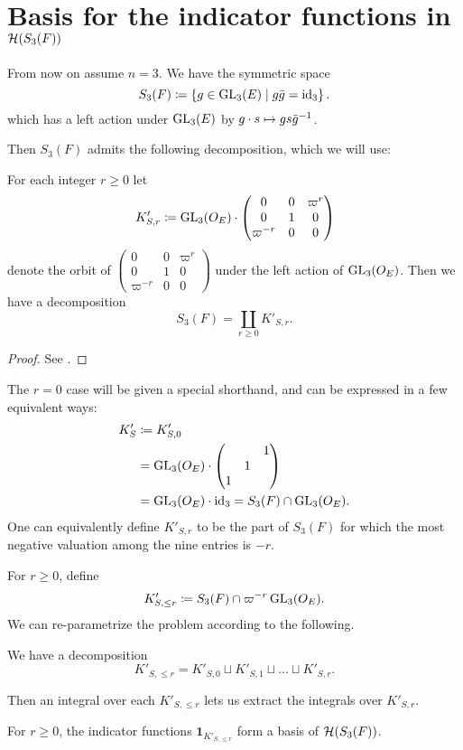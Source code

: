 \section{Basis for the indicator functions in $\mathcal H(S_3(F))$}
\label{ch:orbital0_hecke_basis}
From now on assume $n = 3$.
We have the symmetric space
\[ S_3(F) \coloneqq \left\{ g \in \operatorname{GL}_3(E) \mid g \bar{g} = \operatorname{id}_3 \right\}. \]
which has a left action under $\operatorname{GL}_3(E)$ by $g \cdot s \mapsto gs\bar{g}^{-1}$.

Then $S_3(F)$ admits the following decomposition, which we will use:
\begin{lemma}
  For each integer $r \ge 0$ let
  \[ K'_{S,r} \coloneqq \operatorname{GL}_3(O_E) \cdot \begin{pmatrix} 0 & 0 & \varpi^r \\ 0 & 1 & 0 \\ \varpi^{-r} & 0 & 0 \end{pmatrix} \]
  denote the orbit of
  $\begin{pmatrix} 0 & 0 & \varpi^r \\ 0 & 1 & 0 \\ \varpi^{-r} & 0 & 0 \end{pmatrix}$
  under the left action of $\operatorname{GL}_3(O_E)$.
  Then we have a decomposition
  \[ S_3(F) = \coprod_{r \geq 0} K'_{S,r}. \]
\end{lemma}
\begin{proof}
  See \cite[\S3]{ref:pacific_offen_sphere}.
\end{proof}

The $r=0$ case will be given a special shorthand,
and can be expressed in a few equivalent ways:
\begin{align*}
  K'_S
  &\coloneqq K'_{S,0} \\
  &= \operatorname{GL}_3(O_E) \cdot \begin{pmatrix} & & 1 \\ & 1 \\ 1 \end{pmatrix} \\
  &= \operatorname{GL}_3(O_E) \cdot \operatorname{id}_3 = S_3(F) \cap \operatorname{GL}_3(O_E).
\end{align*}
One can equivalently define $K'_{S,r}$ to be the part of $S_3(F)$
for which the most negative valuation among the nine entries is $-r$.

For $r \geq 0$, define
\[ K'_{S, \le r} \coloneqq S_3(F) \cap \varpi^{-r} \operatorname{GL}_3(O_E). \]
We can re-parametrize the problem according to the following.
\begin{corollary}
  We have a decomposition
  \[ K'_{S, \le r} = K'_{S,0} \sqcup K'_{S,1} \sqcup \dots \sqcup K'_{S,r}. \]
\end{corollary}
Then an integral over each $K'_{S, \le r}$ lets us extract the integrals over $K'_{S,r}$.
\begin{corollary}
  For $r \ge 0$, the indicator functions $\mathbf{1}_{K'_{S, \le r}}$
  form a basis of $\mathcal H(S_3(F))$.
\end{corollary}

